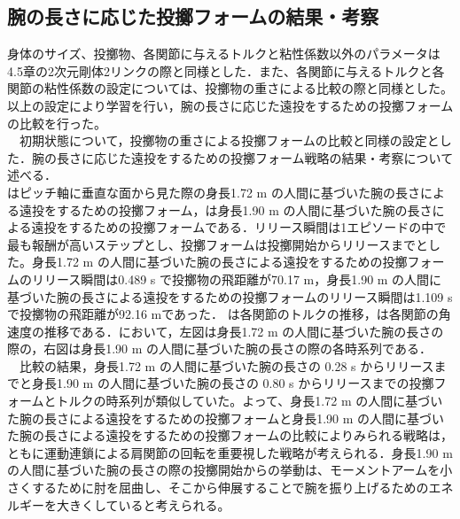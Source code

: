 \begin{small}
\subsection{腕の長さに応じた投擲フォームの結果・考察}
身体のサイズ、投擲物、各関節に与えるトルクと粘性係数以外のパラメータは4.5章の2次元剛体2リンクの際と同様とした．また、各関節に与えるトルクと各関節の粘性係数の設定については、投擲物の重さによる比較の際と同様とした。
以上の設定により学習を行い，腕の長さに応じた遠投をするための投擲フォームの比較を行った。\\
　初期状態について，投擲物の重さによる投擲フォームの比較と同様の設定とした．腕の長さに応じた遠投をするための投擲フォーム戦略の結果・考察について述べる．\\
はピッチ軸に垂直な面から見た際の身長1.72 m の人間に基づいた腕の長さによる遠投をするための投擲フォーム，は身長1.90 m の人間に基づいた腕の長さによる遠投をするための投擲フォームである．リリース瞬間は1エピソードの中で最も報酬が高いステップとし、投擲フォームは投擲開始からリリースまでとした。身長1.72 m の人間に基づいた腕の長さによる遠投をするための投擲フォームのリリース瞬間は0.489 s で投擲物の飛距離が70.17 m，身長1.90 m の人間に基づいた腕の長さによる遠投をするための投擲フォームのリリース瞬間は1.109 s で投擲物の飛距離が92.16 mであった．
は各関節のトルクの推移，は各関節の角速度の推移である．において，左図は身長1.72 m の人間に基づいた腕の長さの際の，右図は身長1.90 m の人間に基づいた腕の長さの際の各時系列である．\\
　比較の結果，身長1.72 m の人間に基づいた腕の長さの 0.28 s からリリースまでと身長1.90 m の人間に基づいた腕の長さの 0.80 s からリリースまでの投擲フォームとトルクの時系列が類似していた。よって、身長1.72 m の人間に基づいた腕の長さによる遠投をするための投擲フォームと身長1.90 m の人間に基づいた腕の長さによる遠投をするための投擲フォームの比較によりみられる戦略は，ともに運動連鎖による肩関節の回転を重要視した戦略が考えられる．身長1.90 m の人間に基づいた腕の長さの際の投擲開始からの挙動は、モーメントアームを小さくするために肘を屈曲し、そこから伸展することで腕を振り上げるためのエネルギーを大きくしていると考えられる。

\end{small}
